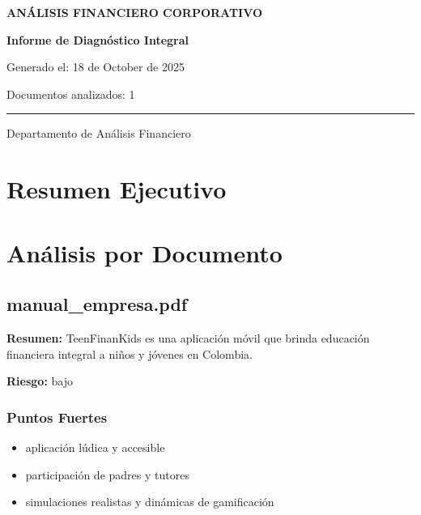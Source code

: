 \documentclass[11pt]{article}
\begin{document}
\begin{titlepage}
    \centering
    \vspace*{2cm}
    \vspace{1cm}
    
    {\Huge\color{corporate-blue}\textbf{ANÁLISIS FINANCIERO CORPORATIVO}}
    \vspace{1cm}
    
    {\Large\textbf{Informe de Diagnóstico Integral}}
    \vspace{1.5cm}
    
    {\large Generado el: 18 de October de 2025}
    \vspace{0.5cm}
    
    {\large Documentos analizados: 1}
    \vspace{2cm}
    
    \rule{\textwidth}{0.4pt}
    \vspace{0.5cm}
    
    {\large Departamento de Análisis Financiero}
    \vfill
\end{titlepage}

\tableofcontents
\newpage


    \section{Resumen Ejecutivo}
    \noindent{}

    \section{Análisis por Documento}
    
    \subsection{manual_empresa.pdf}
    \textbf{Resumen:} TeenFinanKids es una aplicación móvil que brinda educación financiera integral a niños y jóvenes en Colombia.

    \textbf{Riesgo:} bajo

    \subsubsection{Puntos Fuertes}
    \begin{itemize}
        \item aplicación lúdica y accesible
    \item participación de padres y tutores
    \item simulaciones realistas y dinámicas de gamificación
\end{itemize}
\end{document}
